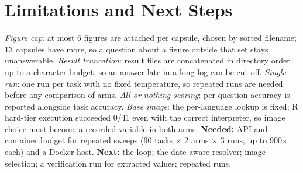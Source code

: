 \documentclass[10pt]{article}
\begin{document}
\section{Limitations and Next Steps}
\emph{Figure cap}: at most 6 figures are attached per capsule, chosen by sorted filename; 13 capsules have more, so a question about a figure outside that set stays unanswerable. \emph{Result truncation}: result files are concatenated in directory order up to a character budget, so an answer late in a long log can be cut off. \emph{Single run}: one run per task with no fixed temperature, so repeated runs are needed before any comparison of arms. \emph{All-or-nothing scoring}: per-question accuracy is reported alongside task accuracy. \emph{Base image}: the per-language lookup is fixed; R hard-tier execution succeeded 0/41 even with the correct interpreter, so image choice must become a recorded variable in both arms. \textbf{Needed:} API and container budget for repeated sweeps (90 tasks $\times$ 2 arms $\times$ 3 runs, up to 900\,s each) and a Docker host. \textbf{Next:} the loop; the date-aware resolver; image selection; a verification run for extracted values; repeated runs.

{\scriptsize
\setlength{\bibsep}{0pt}


}
\end{document}
